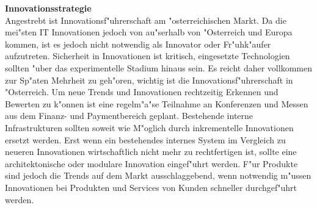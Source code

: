 \textbf{Innovationsstrategie}\\
Angestrebt ist Innovationsf"uhrerschaft am "osterreichischen Markt. Da die mei"sten IT Innovationen jedoch von au"serhalb von "Osterreich und Europa kommen, ist es jedoch nicht notwendig als Innovator oder Fr"uhk"aufer aufzutreten. Sicherheit in Innovationen ist kritisch, eingesetzte Technologien sollten "uber das experimentelle Stadium hinaus sein. Es reicht daher vollkommen zur Sp"aten Mehrheit zu geh"oren, wichtig ist die Innovationsf"uhrerschaft in "Osterreich. \cite{Rogers2003} Um neue Trends und Innovationen rechtzeitig Erkennen und Bewerten zu k"onnen ist eine regelm"a"se Teilnahme an Konferenzen und Messen aus dem Finanz- und Paymentbereich geplant. Bestehende interne Infrastrukturen sollten soweit wie M"oglich durch inkrementelle Innovationen ersetzt werden. Erst wenn ein bestehendes internes System im Vergleich zu neueren Innovationen wirtschaftlich nicht mehr zu rechtfertigen ist, sollte eine architektonische oder modulare Innovation eingef"uhrt werden. F"ur Produkte sind jedoch die Trends auf dem Markt ausschlaggebend, wenn notwendig m"ussen Innovationen bei Produkten und Services von Kunden schneller durchgef"uhrt werden.\\\\